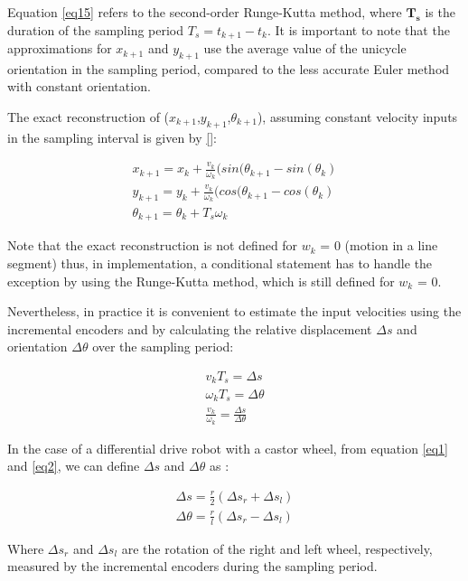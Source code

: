 Equation \ref{eq15} refers to the second-order Runge-Kutta method, where $\boldsymbol{T_s}$ is the duration of the sampling period $T_s = t_{k+1} - t_k$. It is important to note that the approximations for $x_{k+1}$ and $y_{k+1}$ use the average value of the unicycle orientation in the sampling period, compared to the less accurate Euler method with constant orientation.

The exact reconstruction of ($x_{k+1}$,$y_{k+1}$,$\theta_{k+1}$), assuming constant velocity inputs in the sampling interval is given by \ref{}: 

\begin{align}
x_{k+1} = x_k + \frac{v_k}{\omega_k}(sin(\theta_{k+1} - sin(\theta_k)\\
y_{k+1} = y_k + \frac{v_k}{\omega_k}(cos(\theta_{k+1} - cos(\theta_k) \label{eq16} \\
\theta_{k+1} = \theta_k + T_s\omega_k  \nonumber 
\end{align}

Note that the exact reconstruction is not defined for $w_k$ = 0 (motion in a line segment) thus, in implementation, a conditional statement has to handle the exception by using the Runge-Kutta method, which is still defined for $w_k$ = 0.

Nevertheless, in practice it is convenient to estimate the input velocities using the incremental encoders	and by calculating the relative displacement $\Delta s$ and orientation $\Delta\theta$  over the sampling period:

\begin{align}
v_k T_s = \Delta s \nonumber \\
\omega_k T_s = \Delta\theta \label{eq17} \\
\frac{v_k}{\omega_k} = \frac{\Delta s}{\Delta\theta} \nonumber
\end{align}

In the case of a differential drive robot with a castor wheel, from equation \ref{eq1} and \ref{eq2}, we can define $\Delta s$ and $\Delta\theta$ as :

\begin{align}
\Delta s 	 = \frac{r}{2}(\Delta s_r + \Delta s_l) \label{eq18} \\
\Delta\theta = \frac{r}{l}(\Delta s_r - \Delta s_l) \nonumber
\end{align}

Where $\Delta s_r$ and  $\Delta s_l$ are the rotation of the right and left wheel, respectively, measured by the incremental encoders during the sampling period. 



